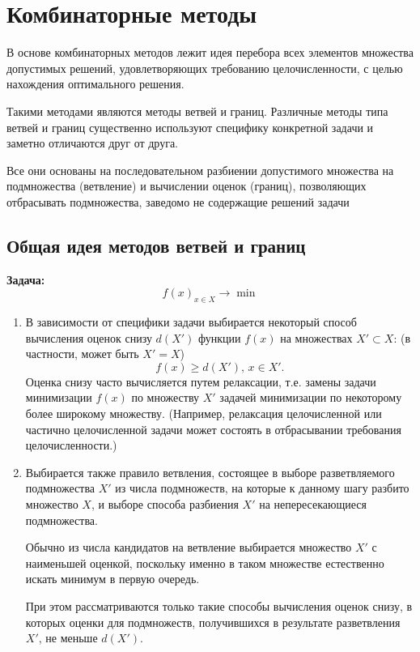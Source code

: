 \documentclass[17pt]{extarticle}
\begin{document}
\section{Комбинаторные методы}
В основе комбинаторных методов лежит идея
перебора всех элементов множества допустимых
решений, удовлетворяющих требованию
целочисленности, с целью нахождения
оптимального решения.

Такими методами являются методы ветвей и границ.
Различные методы типа ветвей и границ существенно
используют специфику конкретной задачи и заметно
отличаются друг от друга.

Все они основаны на последовательном разбиении
допустимого множества на подмножества (ветвление) и
вычислении оценок (границ), позволяющих отбрасывать
подмножества, заведомо не содержащие решений задачи

\subsection{Общая идея методов ветвей и границ}
\textbf{Задача:}
\[
    f(x)_{x \in X} \rightarrow \min
\]
\begin{enumerate}
    \item В зависимости от специфики задачи выбирается некоторый способ вычисления оценок
          снизу \( d(X') \) функции \( f(x) \) на множествах \( X' \subset X \):
          (в частности, может быть \( X' = X \))
          \[
              f(x) \geq d(X'), \, x \in X'.
          \]
          Оценка снизу часто вычисляется путем релаксации,
          т.е. замены задачи минимизации \( f(x) \) по множеству \( X' \) задачей минимизации по некоторому более широкому множеству.
          (Например, релаксация целочисленной или частично целочисленной задачи может состоять в отбрасывании требования целочисленности.)

    \item Выбирается также правило ветвления, состоящее в выборе разветвляемого подмножества \( X' \) из числа подмножеств,
          на которые к данному шагу разбито множество \( X \), и выборе способа разбиения \( X' \) на непересекающиеся подмножества.

          Обычно из числа кандидатов на ветвление выбирается множество \( X' \) с наименьшей оценкой,
          поскольку именно в таком множестве естественно искать минимум в первую очередь.

          При этом рассматриваются только такие способы вычисления оценок снизу, в которых оценки для подмножеств,
          получившихся в результате разветвления \( X' \), не меньше \( d(X') \).
\end{enumerate}
\end{document}
